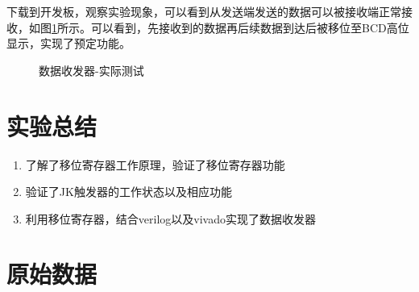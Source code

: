 \documentclass[UTF8]{ctexart}
\numberwithin{figure}{subsection}
\numberwithin{table}{subsection}
\numberwithin{equation}{subsection}
\begin{document}
\par 下载到开发板，观察实验现象，可以看到从发送端发送的数据可以被接收端正常接收，如图\ref{dataSR exp}所示。可以看到，先接收到的数据再后续数据到达后被移位至BCD高位显示，实现了预定功能。

\begin{figure}[H]
    \centering
    \caption{数据收发器-实际测试}
    \label{dataSR exp}
\end{figure}


\section{实验总结}
\begin{enumerate}
    \item 了解了移位寄存器工作原理，验证了移位寄存器功能
    \item 验证了JK触发器的工作状态以及相应功能
    \item 利用移位寄存器，结合verilog以及vivado实现了数据收发器
\end{enumerate}

\section*{原始数据}


\end{document}
